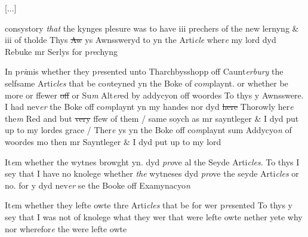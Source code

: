 \documentclass[12pt, a4paper]{book}
\begin{document}
				[...]
			
            		
            			consystory \textit{that} the kynges plesure was to have iii prechers of the new lernyng \& iii of tholde
            			Thys \sout{Aw }ys Awnssweryd to yn the Arti\textit{cle} wher\textit{e} my lord dyd Rebuke mr Serlys for p\textit{re}chyng
			
            		

				\marginpar[\vspace{0.5cm}{\textcolor{Gray}{1}}]{}
			
 
		\ifthenelse{\isodd{\thepage}}
		{\reversemarginpar}
		{\normalmarginpar}
		In p\textit{ri}mis whether they p\textit{re}sented unto Tharchbysshopp off Caunt\textit{erbury} the selfsame
Arti\textit{cles} that be co\textit{n}teyned yn the Boke of co\textit{m}playnt. or whether be more
or ffewer \sout{off }or Su\textit{m} Alt\textit{er}ed by addycyon off woordes
To thys y Awnsswere. I had nev\textit{er} the Boke off co\textit{m}playnt yn my handes nor dyd
\sout{here }Thorowly her\textit{e} the\textit{m} Red and but \sout{very }ffew of them / same soych as 
mr sayntleger \& I dyd put up to my lordes grace  / Ther\textit{e} ys yn the Boke off
co\textit{m}playnt sum Addycyo\textit{n} of woordes mo then mr Sayntleger \& I dyd put up
to my lord
            		
				\marginpar[\vspace{0.5cm}{\textcolor{Gray}{2}}]{}
			
 
		\ifthenelse{\isodd{\thepage}}
		{\reversemarginpar}
		{\normalmarginpar}
		It\textit{e}m whether the wytnes browght yn. dyd \textit{pro}ve al the Seyde Arti\textit{cles}. 
To thys I sey that I have no knolege whether \textit{the} wytneses dyd \textit{pro}ve the seyde
Arti\textit{cles} or no. for y dyd nev\textit{er} se the Booke off Examynacyo\textit{n}
            		
				\marginpar[\vspace{0.5cm}{\textcolor{Gray}{3}}]{}
			
 
		\ifthenelse{\isodd{\thepage}}
		{\reversemarginpar}
		{\normalmarginpar}
		It\textit{e}m whether they lefte owte thre Arti\textit{cles} that be for wer p\textit{re}sented 
To thys y sey that I was not of knolege what they wer that were
			 lefte owte nether
yete why nor wherefor\textit{e} the were lefte owte
            		
\end{document}
